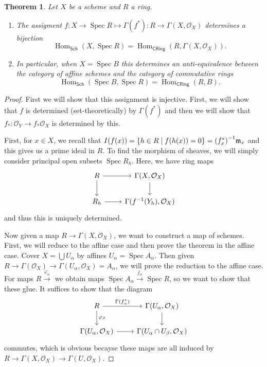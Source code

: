 \documentclass[leqno, openany]{memoir}
\newtheorem{thm}{Theorem}[section]
\theoremstyle{definition}
\theoremstyle{remark}
\theoremstyle{plain}
\theoremstyle{definition}
\theoremstyle{remark}
\newcommand{\mc}[1]{\mathcal{#1}}
\newcommand{\mf}[1]{\mathfrak{#1}}
\newcommand{\ms}[1]{\mathsf{#1}}
\DeclareMathOperator{\Hom}{Hom}
\DeclareMathOperator{\Spec}{Spec}
\begin{document}
\begin{thm}
    Let $X$ be a scheme and $R$ a ring. 
    \begin{enumerate}
        \item The assigment $f \colon X \to \Spec R \mapsto \Gamma(f^*) \colon R \to \Gamma(X, \mc{O}_X)$ determines a bijection
            \[ \Hom_{\ms{Sch}}(X, \Spec R) = \Hom_{\ms{CRing}}(R, \Gamma(X, \mc{O}_X)). \]
        \item In particular, when $X = \Spec B$ this determines an anti-equivalence between the category of affine schemes and the category of commutative rings
            \[ \Hom_{\ms{Sch}}(\Spec B, \Spec R) = \Hom_{\ms{CRing}}(R, B). \]
    \end{enumerate}
\end{thm}

\begin{proof}
    First we will show that this assignment is injective. First, we will show that $f$ is determined (set-theoretically) by $\Gamma(f^*)$ and then we will show that $f_* \colon \mc{O}_Y \to f_* \mc{O}_X$ is determined by this.

    First, for $x \in X$, we recall that $I(f(x)) = \qty{h \in R \mid f(h(x)) = 0} = { (f_x^*) }^{-1} \mf{m}_x$ and this gives us a prime ideal in $R$. To find the morphism of sheaves, we will simply consider principal open subsets $\Spec R_h$. Here, we have ring maps
    \begin{equation*}
    \begin{tikzcd}
        R \arrow{r} \arrow{d} & \Gamma(X, \mc{O}_X) \arrow{d} \\
        R_h \arrow{r} & \Gamma (f^{-1}(Y_h), \mc{O}_X)
    \end{tikzcd}
    \end{equation*}
    and thus this is uniquely determined.

    Now given a map $R \to \Gamma(X, \mc{O}_X)$, we want to construct a map of schemes. First, we will reduce to the affine case and then prove the theorem in the affine case. Cover $X = \bigcup U_{\alpha}$ by affines $U_{\alpha} = \Spec A_{\alpha}$. Then given $R \to \Gamma(\mc{O}_X) \to \Gamma(U_{\alpha}, \mc{O}_X) = A_{\alpha}$, we will prove the reduction to the affine case. For maps $R \xrightarrow{\varphi_{\alpha}}$ we obtain maps $\Spec A_{\alpha} \xrightarrow{f_{\alpha}} \Spec R$, so we want to show that these glue. It suffices to show that the diagram
    \begin{equation*}
    \begin{tikzcd}
        R \arrow{r}{\Gamma(f_{\alpha}^*)} \arrow{d}{\varphi_{\beta}} & \Gamma(U_{\alpha}, \mc{O}_X) \arrow{d} \\
        \Gamma(U_{\alpha}, \mc{O}_X) \arrow{r} & \Gamma(U_{\alpha} \cap U_{\beta}, \mc{O}_X)
    \end{tikzcd}
    \end{equation*}
    commutes, which is obvious becayse these maps are all induced by $R \to \Gamma(X, \mc{O}_X) \to \Gamma(U, \mc{O}_X)$.


\end{proof}
\end{document}
